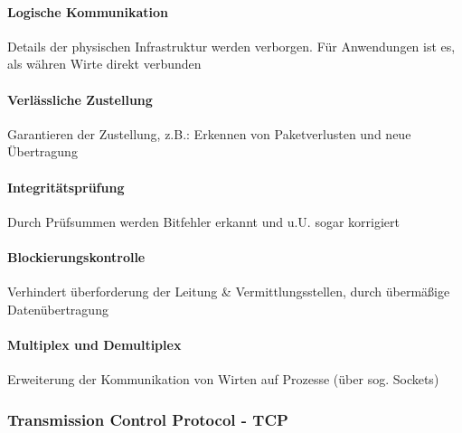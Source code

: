 \documentclass[12pt]{report}
\begin{document}
\paragraph{Logische Kommunikation}
Details der physischen Infrastruktur werden verborgen. Für Anwendungen ist es, als währen Wirte direkt verbunden

\paragraph{Verlässliche Zustellung}
Garantieren der Zustellung, z.B.: Erkennen von Paketverlusten und neue Übertragung

\paragraph{Integritätsprüfung}
Durch Prüfsummen werden Bitfehler erkannt und u.U. sogar korrigiert

\paragraph{Blockierungskontrolle}
Verhindert überforderung der Leitung \& Vermittlungsstellen, durch übermäßige Datenübertragung

\paragraph{Multiplex und Demultiplex}
Erweiterung der Kommunikation von Wirten auf Prozesse (über sog. Sockets)

\subsubsection{Transmission Control Protocol - TCP}
\end{document}
